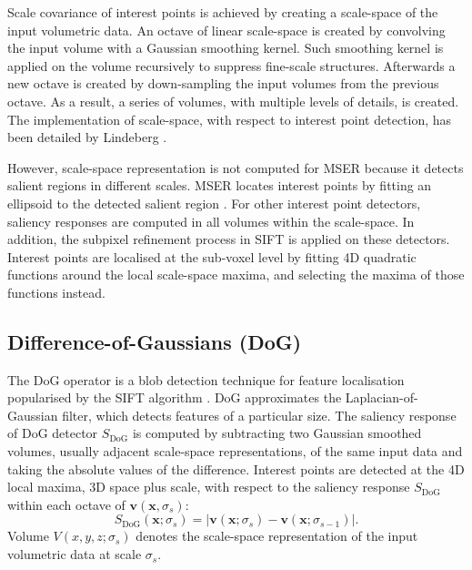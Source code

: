Scale covariance of interest points is achieved by creating a scale-space of the input volumetric data. An octave of linear scale-space is created by convolving the input volume with a Gaussian smoothing kernel. Such smoothing kernel is applied on the volume recursively to suppress fine-scale structures. Afterwards a new octave is created by down-sampling the input volumes from the previous octave. As a result, a series of volumes, with multiple levels of details, is created. The implementation of scale-space, with respect to interest point detection, has been detailed by Lindeberg \cite{Lindeberg1998}. 

However, scale-space representation is not computed for MSER because it detects salient regions in different scales. MSER locates interest points by fitting an ellipsoid to the detected salient region \cite{Matas2004}. For other interest point detectors, saliency responses are computed in all volumes within the scale-space. In addition, the subpixel refinement process in SIFT \cite{Lowe2004} is applied on these detectors. Interest points are localised at the sub-voxel level by fitting 4D quadratic functions around the local scale-space maxima, and selecting the maxima of those functions instead. 

\subsection{Difference-of-Gaussians (DoG)}
The DoG operator is a blob detection technique for feature localisation popularised by the SIFT algorithm \cite{Lowe2004}. DoG approximates the Laplacian-of-Gaussian filter, which detects features of a particular size. 
The saliency response of DoG detector $S_{\textrm{DoG}}$ is computed by subtracting two Gaussian smoothed volumes, usually adjacent scale-space representations, of the same input data and taking the absolute values of the difference.
Interest points are detected at the 4D local maxima, \ie 3D space plus scale, with respect to the saliency response $S_{\textrm{DoG}}$ within each octave of $\mathbf{v}(\mathbf{x},\sigma_s)$: 
\begin{equation}
	\label{eqn/eval/dog} 
	S_{\textrm{DoG}}(\mathbf{x};\sigma_s) = \bigg|\mathbf{v}(\mathbf{x};\sigma_s) - \mathbf{v}(\mathbf{x};\sigma_{s-1})\bigg|.
\end{equation}
Volume $V(x,y,z;\sigma_s)$ denotes the scale-space representation of the input volumetric data at scale $\sigma_s$.


